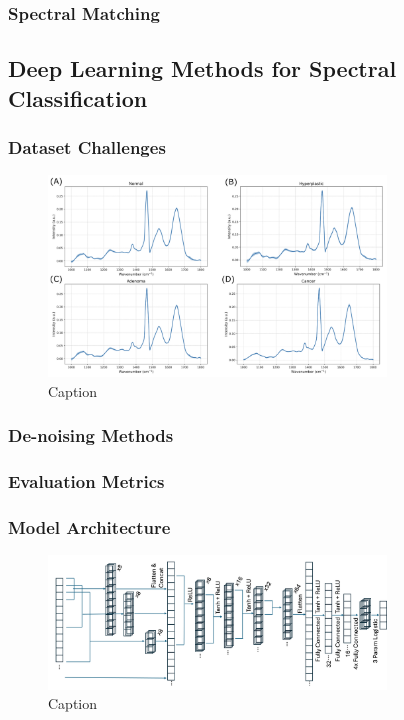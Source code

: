 \subsubsection{Spectral Matching}


\subsection{Deep Learning Methods for Spectral Classification}
\subsubsection{Dataset Challenges}
\begin{figure}[htbp]
  \centering
  \includegraphics[width=0.8\textwidth]{Images/Dataset_Class_Differences.png}
  \caption{Caption}
  \label{fig:my-label}
\end{figure}

\subsubsection{De-noising Methods}
\subsubsection{Evaluation Metrics}

\subsubsection{Model Architecture}
\begin{figure}[htbp]
  \centering
  \includegraphics[width=0.8\textwidth]{Images/SCNN_TPL_Arch.png}
  \caption{Caption}
  \label{fig:my-label}
\end{figure}

